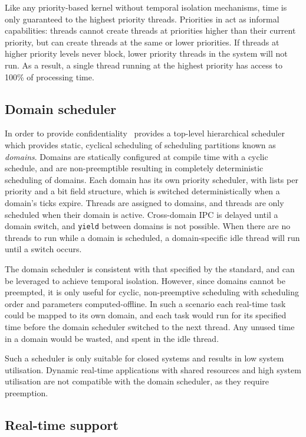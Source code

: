 Like any priority-based kernel without temporal isolation mechanisms, time is only guaranteed to the highest priority threads.
Priorities in \selfour act as informal capabilities: threads cannot create threads at priorities higher than their current priority, but can create threads at the same or lower priorities.
If threads at higher priority levels never block, lower priority threads in the system will not run.
As a result, a single thread running at the highest priority has access to 100\% of processing time.

\subsection{Domain scheduler}

In order to provide confidentiality~\citep{Murray_MBGBSLGK_13} \selfour provides a top-level hierarchical scheduler
which provides static, cyclical scheduling of scheduling partitions known as \emph{domains}. 
Domains are statically configured at compile time with a cyclic schedule, and are non-preemptible
resulting in completely deterministic scheduling of domains.
Each domain has its own priority scheduler, with lists per priority and a bit field structure, which is switched deterministically when a domain's
ticks expire. 
Threads are assigned to domains, and threads are only scheduled when their domain is active.
Cross-domain \gls{IPC} is delayed until a domain switch, and \texttt{yield} between domains is not
possible. When there are no threads to run while a domain is scheduled, a domain-specific idle thread will run until a switch occurs.

The domain scheduler is consistent with that specified by the \citet{ARINC653} standard, and 
can be leveraged to achieve temporal isolation. However, since domains cannot be
preempted, it is only useful for cyclic, non-preemptive scheduling with scheduling order and
parameters computed-offline.
In such a scenario each real-time task could be mapped to its own domain, and each task would run for its specified time before the domain scheduler switched to the next thread.
Any unused time in a domain would be wasted, and spent in the idle thread.

Such a scheduler is only suitable for closed systems and results in low system utilisation.
Dynamic real-time applications with shared resources and high system utilisation are not compatible
with the domain scheduler, as they require preemption.

\subsection{Real-time support}

